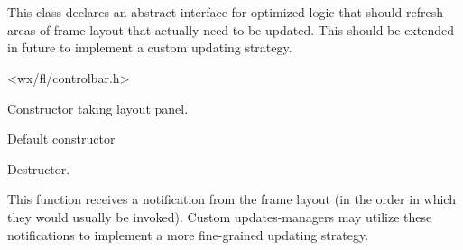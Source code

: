 %
%


\section{}\label{cbupdatesmanagerbase}


This class declares an abstract interface for optimized logic that should refresh
areas of frame layout that actually need to be updated. This should be extended in future
to implement a custom updating strategy.




<wx/fl/controlbar.h>




\label{cbupdatesmanagerbasecbupdatesmanagerbase}


Constructor taking layout panel.



Default constructor


\label{cbupdatesmanagerbasedtor}


Destructor.


\label{cbupdatesmanagerbaseonbarwillchange}


This function receives a notification from the frame layout (in the order in which
they would usually be invoked). Custom updates-managers may utilize
these notifications to implement a more fine-grained updating strategy.


\label{cbupdatesmanagerbaseonfinishchanges}


